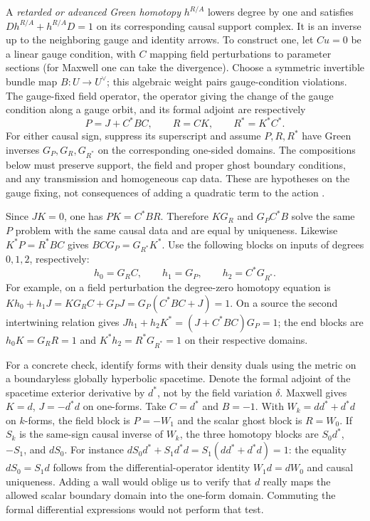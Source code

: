 A \emph{retarded or advanced Green homotopy} $h^{R/A}$ lowers degree by one
and satisfies $Dh^{R/A}+h^{R/A}D=1$ on its corresponding causal support
complex. It is an inverse up to the neighboring gauge and identity arrows.
To construct one, let $Cu=0$ be a linear gauge condition, with $C$ mapping
field perturbations to parameter sections (for Maxwell one can take the
divergence). Choose a symmetric invertible bundle map $B:U\to U^\vee$;
this algebraic weight pairs gauge-condition violations. The gauge-fixed
field operator, the operator giving the change of the gauge condition along
a gauge orbit, and its formal adjoint are respectively
\[
 P=J+C^*BC,\qquad R=CK,\qquad R^*=K^*C^*.
\]
For either causal sign, suppress its superscript and assume $P,R,R^*$
have Green inverses $G_P,G_R,G_{R^*}$ on the corresponding one-sided
domains. The compositions below must preserve support, the field and proper
ghost boundary conditions, and any transmission and homogeneous cap data.
These are hypotheses on the gauge fixing, not consequences of adding a
quadratic term to the action \cite{Khavkine}.

Since $JK=0$, one has $PK=C^*BR$. Therefore $KG_R$ and $G_PC^*B$ solve
the same $P$ problem with the same causal data and are equal by uniqueness.
Likewise $K^*P=R^*BC$ gives $BCG_P=G_{R^*}K^*$. Use the following blocks
on inputs of degrees $0,1,2$, respectively:
\[
 h_0=G_R C,\qquad h_1=G_P,\qquad h_2=C^*G_{R^*}.
\]
For example, on a field perturbation the degree-zero homotopy equation is
$Kh_0+h_1J=KG_R C+G_PJ=G_P(C^*BC+J)=1$. On a source the second
intertwining relation gives $Jh_1+h_2K^*=(J+C^*BC)G_P=1$; the end blocks
are $h_0K=G_RR=1$ and $K^*h_2=R^*G_{R^*}=1$ on their respective domains.

For a concrete check, identify forms with their density duals using the metric on a boundaryless globally hyperbolic spacetime. Denote the formal adjoint of the spacetime exterior derivative by $d^*$, not by the field variation $\delta$. Maxwell gives $K=d$, $J=-d^*d$ on one-forms. Take $C=d^*$ and $B=-1$. With $W_k=dd^*+d^*d$ on $k$-forms, the field block is $P=-W_1$ and the scalar ghost block is $R=W_0$. If $S_k$ is the same-sign causal inverse of $W_k$, the three homotopy blocks are $S_0 d^*$, $-S_1$, and $d S_0$. For instance $d S_0d^*+S_1d^*d=S_1(dd^*+d^*d)=1$: the equality $d S_0=S_1 d$ follows from the differential-operator identity $W_1 d=d W_0$ and causal uniqueness. Adding a wall would oblige us to verify that $d$ really maps the allowed scalar boundary domain into the one-form domain. Commuting the formal differential expressions would not perform that test.

